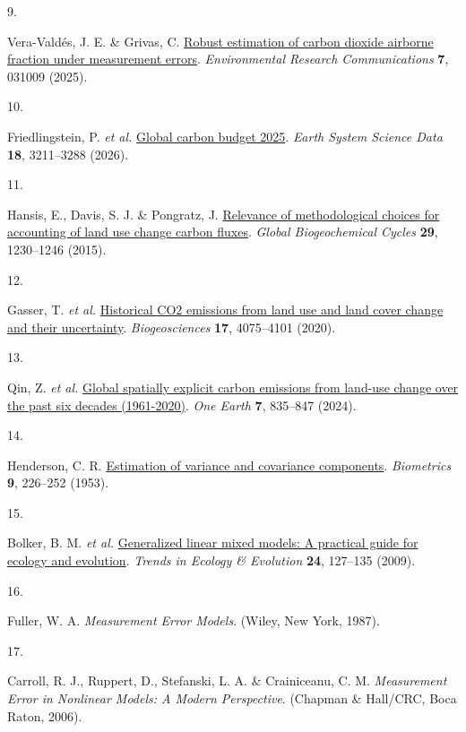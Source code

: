 \documentclass[
  12pt,
  letterpaper,
  DIV=11,
  numbers=noendperiod]{scrartcl}
\newlength{\cslhangindent}
\newlength{\csllabelwidth}
\newenvironment{CSLReferences}[2] %
 {\begin{list}{}{%
  \setlength{\itemindent}{0pt}
  \setlength{\leftmargin}{0pt}
  \setlength{\parsep}{0pt}
  \ifodd #1
   \setlength{\leftmargin}{\cslhangindent}
   \setlength{\itemindent}{-1\cslhangindent}
  \fi
  \setlength{\itemsep}{#2\baselineskip}}}
 {\end{list}}
\newcommand{\CSLLeftMargin}[1]{\parbox[t]{\csllabelwidth}{\strut#1\strut}}
\newcommand{\CSLRightInline}[1]{\parbox[t]{\linewidth - \csllabelwidth}{\strut#1\strut}}
\begin{document}
\begin{CSLReferences}{0}{0}
\CSLLeftMargin{9. }%
\CSLRightInline{Vera-Valdés, J. E. \& Grivas, C.
\href{https://doi.org/10.1088/2515-7620/adc06b}{Robust estimation of
carbon dioxide airborne fraction under measurement errors}.
\emph{Environmental Research Communications} \textbf{7}, 031009 (2025).}

\CSLLeftMargin{10. }%
\CSLRightInline{Friedlingstein, P. \emph{et al.}
\href{https://doi.org/10.5194/essd-18-3211-2026}{Global carbon budget
2025}. \emph{Earth System Science Data} \textbf{18}, 3211--3288 (2026).}

\CSLLeftMargin{11. }%
\CSLRightInline{Hansis, E., Davis, S. J. \& Pongratz, J.
\href{https://doi.org/10.1002/2014GB004997}{Relevance of methodological
choices for accounting of land use change carbon fluxes}. \emph{Global
Biogeochemical Cycles} \textbf{29}, 1230--1246 (2015).}

\CSLLeftMargin{12. }%
\CSLRightInline{Gasser, T. \emph{et al.}
\href{https://doi.org/10.5194/bg-17-4075-2020}{Historical {CO2}
emissions from land use and land cover change and their uncertainty}.
\emph{Biogeosciences} \textbf{17}, 4075--4101 (2020).}

\CSLLeftMargin{13. }%
\CSLRightInline{Qin, Z. \emph{et al.}
\href{https://doi.org/10.1016/j.oneear.2024.04.002}{Global spatially
explicit carbon emissions from land-use change over the past six decades
(1961-2020)}. \emph{One Earth} \textbf{7}, 835--847 (2024).}

\CSLLeftMargin{14. }%
\CSLRightInline{Henderson, C. R.
\href{https://doi.org/10.2307/3001881}{Estimation of variance and
covariance components}. \emph{Biometrics} \textbf{9}, 226--252 (1953).}

\CSLLeftMargin{15. }%
\CSLRightInline{Bolker, B. M. \emph{et al.}
\href{https://doi.org/10.1016/j.tree.2008.10.008}{Generalized linear
mixed models: A practical guide for ecology and evolution}. \emph{Trends
in Ecology \& Evolution} \textbf{24}, 127--135 (2009).}

\CSLLeftMargin{16. }%
\CSLRightInline{Fuller, W. A. \emph{Measurement Error Models}. (Wiley,
New York, 1987).}

\CSLLeftMargin{17. }%
\CSLRightInline{Carroll, R. J., Ruppert, D., Stefanski, L. A. \&
Crainiceanu, C. M. \emph{Measurement Error in Nonlinear Models: A Modern
Perspective}. (Chapman \& Hall/CRC, Boca Raton, 2006).}


\end{CSLReferences}
\end{document}
